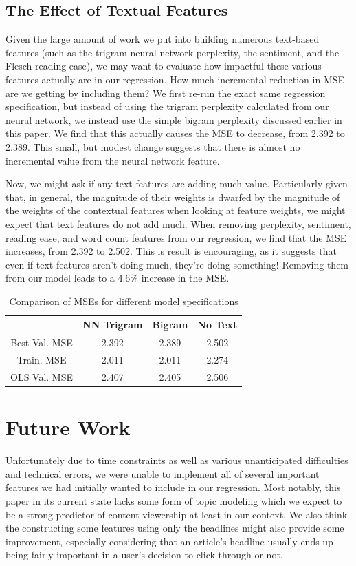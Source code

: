 \documentclass[fleqn,12pt]{SelfArx} %
\begin{document}
\subsection{The Effect of Textual Features}

Given the large amount of work we put into building numerous text-based features (such as the trigram neural network perplexity, the sentiment, and the Flesch reading ease), we may want to evaluate how impactful these various features actually are in our regression. How much incremental reduction in MSE are we getting by including them? We first re-run the exact same regression specification, but instead of using the trigram perplexity calculated from our neural network, we instead use the simple bigram perplexity discussed earlier in this paper. We find that this actually causes the MSE to decrease, from 2.392 to 2.389. This small, but modest change suggests that there is almost no incremental value from the neural network feature.

Now, we might ask if any text features are adding much value. Particularly given that, in general, the magnitude of their weights is dwarfed by the magnitude of the weights of the contextual features when looking at feature weights, we might expect that text features do not add much. When removing perplexity, sentiment, reading ease, and word count features from our regression, we find that the MSE increases, from 2.392 to 2.502. This is result is encouraging, as it suggests that even if text features aren't doing much, they're doing something! Removing them from our model leads to a 4.6\% increase in the MSE.

\begin{table}[hbt]
\caption{Comparison of MSEs for different model specifications}
\centering
\begin{tabular}{cccc}
\toprule
  & NN Trigram & Bigram & No Text\\
\midrule
Best Val. MSE & 2.392 & 2.389 &  2.502 \\
Train. MSE & 2.011 & 2.011 &  2.274 \\
OLS Val. MSE & 2.407 & 2.405 & 2.506 \\ 
\bottomrule
\end{tabular}
\end{table}

\section{Future Work}
Unfortunately due to time constraints as well as various unanticipated difficulties and technical errors, we were unable to implement all of several important features we had initially wanted to include in our regression. Most notably, this paper in its current state lacks some form of topic modeling which we expect to be a strong predictor of content viewership at least in our context. We also think the constructing some features using only the headlines might also provide some improvement, especially considering that an article's headline usually ends up being fairly important in a user's decision to click through or not.
\end{document}
